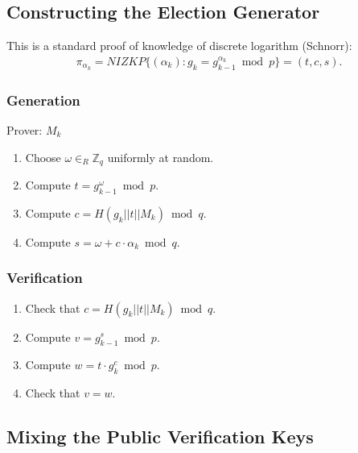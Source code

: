 \documentclass[bibtotoc,halfparskip,oneside]{scrreprt}
\newcommand{\Mixer}[1]{\ensuremath{\mathit{M}_{#1}}\xspace}
\begin{document}
\subsection{Constructing the Election Generator}\label{proof_fresh}

This is a standard proof of knowledge of discrete logarithm (Schnorr):
\begin{align*}
\pi_{\alpha_k}=\mathit{NIZKP}\{(\alpha_k):g_k=g_{k-1}^{\alpha_k}\bmod{p}\}=(t,c,s).
\end{align*}
 
\subsubsection{Generation}
Prover: $\Mixer{k}$
\begin{enumerate}	
	\item Choose $\omega\in_R\mathbb{Z}_q$ uniformly at random.
	\item Compute $t=g_{k-1}^{\omega}\bmod{p}$.
	\item Compute $c=H(g_k||t||\Mixer{k})\bmod{q}$.
	\item Compute $s=\omega + c\cdot \alpha_k \bmod{q}$.
\end{enumerate}	

\subsubsection{Verification}
\begin{enumerate}
	\item Check that $c=H(g_k||t||\Mixer{k})\bmod{q}$.
	\item Compute $v=g_{k-1}^{s}\bmod{p}$.
	\item Compute $w=t\cdot g_k^{c}\bmod{p}$.
	\item Check that $v=w$.
\end{enumerate}

\subsection{Mixing the Public Verification Keys}\label{proof_mix_keys}
\end{document}
